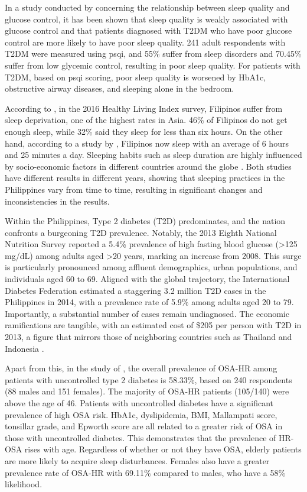 In a study conducted by \textcite{zaraspe-2017} concerning the relationship
between sleep quality and glucose control, it has been shown that sleep quality
is weakly associated with glucose control and that patients diagnosed with T2DM
who have poor glucose control are more likely to have poor sleep quality. 241
adult respondents with T2DM were measured using \ac{psqi}, and 55\% suffer from sleep disorders and 70.45\% suffer from low
glycemic control, resulting in poor sleep quality. For patients with T2DM, based
on \ac{psqi} scoring, poor sleep quality is worsened by HbA1c, obstructive airway
diseases, and sleeping alone in the bedroom.

According to \textcite{pelegrino-2021}, in the 2016 Healthy Living Index survey,
Filipinos suffer from sleep deprivation, one of the highest rates in Asia. 46\%
of Filipinos do not get enough sleep, while 32\% said they sleep for less than six
hours. On the other hand, according to a study by \textcite{singh-2020},
Filipinos now sleep with an average of 6 hours and 25 minutes a day. Sleeping
habits such as sleep duration are highly influenced by socio-economic factors in
different countries around the globe \parencite{lajunen-2023}. Both studies have
different results in different years, showing that sleeping practices in the
Philippines vary from time to time, resulting in significant changes and
inconsistencies in the results.

Within the Philippines, Type 2 diabetes (T2D) predominates, and the nation
confronts a burgeoning T2D prevalence. Notably, the 2013 Eighth National
Nutrition Survey reported a 5.4\% prevalence of high fasting blood glucose (>125
mg/dL) among adults aged >20 years, marking an increase from 2008. This surge is
particularly pronounced among affluent demographics, urban populations, and
individuals aged 60 to 69. Aligned with the global trajectory, the International
Diabetes Federation estimated a staggering 3.2 million T2D cases in the
Philippines in 2014, with a prevalence rate of 5.9\% among adults aged 20 to 79.
Importantly, a substantial number of cases remain undiagnosed. The economic
ramifications are tangible, with an estimated cost of
\$205 per person with T2D in 2013, a figure that mirrors those of neighboring
countries such as Thailand and Indonesia \parencite{tan-2016}.

Apart from this, in the study of \textcite{de-leon-2021}, the overall prevalence
of OSA-HR among patients with uncontrolled type 2 diabetes is 58.33\%, based on
240 respondents (88 males and 151 females). The majority of OSA-HR patients
(105/140) were above the age of 46. Patients with uncontrolled diabetes have a
significant prevalence of high OSA risk. HbA1c, dyslipidemia, BMI, Mallampati
score, tonsillar grade, and Epworth score are all related to a greater risk of
OSA in those with uncontrolled diabetes. This demonstrates that the prevalence
of HR-OSA rises with age. Regardless of whether or not they have OSA, elderly
patients are more likely to acquire sleep disturbances. Females also have a
greater prevalence rate of OSA-HR with 69.11\% compared to males, who have a
58\% likelihood.

